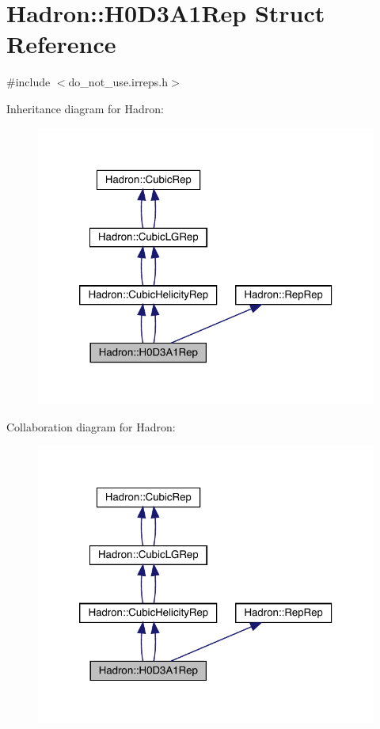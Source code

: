 \hypertarget{structHadron_1_1H0D3A1Rep}{}\section{Hadron\+:\+:H0\+D3\+A1\+Rep Struct Reference}
\label{structHadron_1_1H0D3A1Rep}


{\ttfamily \#include $<$do\+\_\+not\+\_\+use.\+irreps.\+h$>$}



Inheritance diagram for Hadron\+:\nopagebreak
\begin{figure}[H]
\begin{center}
\leavevmode
\includegraphics[width=320pt]{da/d99/structHadron_1_1H0D3A1Rep__inherit__graph}
\end{center}
\end{figure}


Collaboration diagram for Hadron\+:\nopagebreak
\begin{figure}[H]
\begin{center}
\leavevmode
\includegraphics[width=320pt]{dd/d21/structHadron_1_1H0D3A1Rep__coll__graph}
\end{center}
\end{figure}
